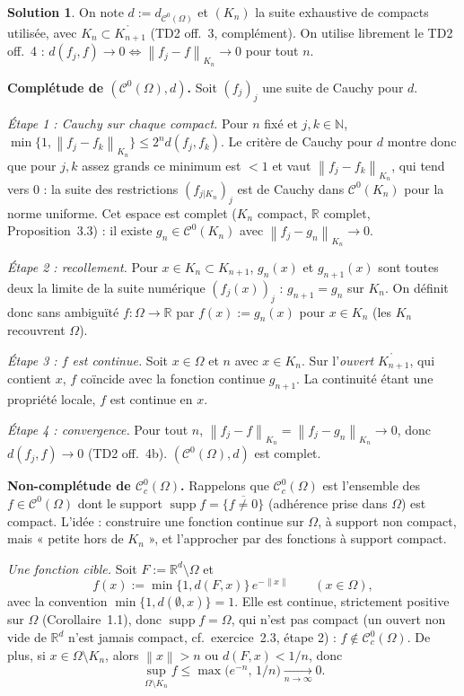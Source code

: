 \documentclass[11pt,a4paper]{article}
\newcommand{\R}{\mathbb{R}}
\newcommand{\N}{\mathbb{N}}
\newcommand{\interieur}[1]{\mathring{#1}}
\newcommand{\adh}[1]{\overline{#1}}
\newcommand{\norm}[1]{\left\|#1\right\|}
\newcommand{\Cz}{\mathcal{C}^0}
\newcommand{\Cc}{\mathcal{C}^0_c}
\DeclareMathOperator{\supp}{supp}
\theoremstyle{definition}
\newtheorem*{solution}{Solution}
\begin{document}
\begin{solution}
On note $d:=d_{\Cz(\Omega)}$ et $(K_n)$ la suite exhaustive de compacts utilisée, avec $K_n\subset\interieur{K_{n+1}}$ (TD2 off.~3, complément). On utilise librement le TD2 off.~4 : $d(f_j,f)\to0\iff\norm{f_j-f}_{K_n}\to0$ pour tout $n$.

\medskip
\noindent\textbf{Complétude de $(\Cz(\Omega),d)$.} Soit $(f_j)_j$ une suite de Cauchy pour $d$.

\emph{Étape 1 : Cauchy sur chaque compact.} Pour $n$ fixé et $j,k\in\N$, $\min\{1,\norm{f_j-f_k}_{K_n}\}\le2^nd(f_j,f_k)$. Le critère de Cauchy pour $d$ montre donc que pour $j,k$ assez grands ce minimum est $<1$ et vaut $\norm{f_j-f_k}_{K_n}$, qui tend vers $0$ : la suite des restrictions $(f_{j|K_n})_j$ est de Cauchy dans $\Cz(K_n)$ pour la norme uniforme. Cet espace est complet ($K_n$ compact, $\R$ complet, Proposition~3.3) : il existe $g_n\in\Cz(K_n)$ avec $\norm{f_j-g_n}_{K_n}\to0$.

\emph{Étape 2 : recollement.} Pour $x\in K_n\subset K_{n+1}$, $g_n(x)$ et $g_{n+1}(x)$ sont toutes deux la limite de la suite numérique $(f_j(x))_j$ : $g_{n+1}=g_n$ sur $K_n$. On définit donc sans ambiguïté $f:\Omega\to\R$ par $f(x):=g_n(x)$ pour $x\in K_n$ (les $K_n$ recouvrent $\Omega$).

\emph{Étape 3 : $f$ est continue.} Soit $x\in\Omega$ et $n$ avec $x\in K_n$. Sur l'\emph{ouvert} $\interieur{K_{n+1}}$, qui contient $x$, $f$ coïncide avec la fonction continue $g_{n+1}$. La continuité étant une propriété locale, $f$ est continue en $x$.

\emph{Étape 4 : convergence.} Pour tout $n$, $\norm{f_j-f}_{K_n}=\norm{f_j-g_n}_{K_n}\to0$, donc $d(f_j,f)\to0$ (TD2 off.~4b). $(\Cz(\Omega),d)$ est complet.

\medskip
\noindent\textbf{Non-complétude de $\Cc(\Omega)$.} Rappelons que $\Cc(\Omega)$ est l'ensemble des $f\in\Cz(\Omega)$ dont le support $\supp f=\adh{\{f\ne0\}}$ (adhérence prise dans $\Omega$) est compact. L'idée : construire une fonction continue sur $\Omega$, à support non compact, mais « petite hors de $K_n$ », et l'approcher par des fonctions à support compact.

\emph{Une fonction cible.} Soit $F:=\R^d\setminus\Omega$ et
\[
f(x):=\min\{1,d(F,x)\}\,e^{-\norm x}\qquad(x\in\Omega),
\]
avec la convention $\min\{1,d(\emptyset,x)\}=1$. Elle est continue, strictement positive sur $\Omega$ (Corollaire~1.1), donc $\supp f=\Omega$, qui n'est pas compact (un ouvert non vide de $\R^d$ n'est jamais compact, cf.\ exercice~2.3, étape 2) : $f\notin\Cc(\Omega)$. De plus, si $x\in\Omega\setminus K_n$, alors $\norm x>n$ ou $d(F,x)<1/n$, donc
\[
\sup_{\Omega\setminus K_n}f\le\max\big(e^{-n},\,1/n\big)\xrightarrow[n\to\infty]{}0 .
\]


\end{solution}
\end{document}
